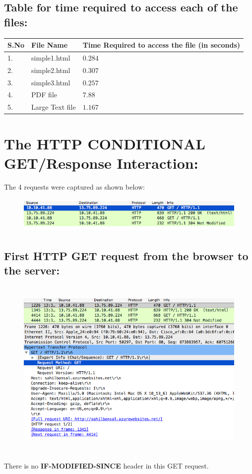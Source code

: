 \documentclass[]{report}
\begin{document}
\subsection{Table for time required to access each of the files:}
\large
\begin{center}
	\begin{tabular}{ |p{1cm}|p{3cm}|p{8cm}|  }
		\hline
		S.No & File Name & Time Required to access the file (in seconds)	\\
		\hline
		1. & simple1.html & $0.284$ \\
		\hline
		2. & simple2.html & $0.307$ \\
		\hline
		3. & simple3.html & $0.257$\\
		\hline
		4. & PDF file & $7.88$ \\
		\hline
		5. & Large Text file & $1.167$\\
		\hline
	\end{tabular} 
\end{center}


\section{The HTTP CONDITIONAL GET/Response Interaction:}
The 4 requests were captured as shown below:
\begin{figure}[H]
	\vspace{0pt}
	\includegraphics[height = 50pt, keepaspectratio]{Snapshots/q2/2.png}
\end{figure}
\subsection{First HTTP GET request from the browser to the server:}
\begin{figure}[H]
	\vspace{0pt}
	\includegraphics[height = 250pt, keepaspectratio]{Snapshots/q2/2_1.png}
\end{figure}
There is no \textbf{IF-MODIFIED-SINCE} header in this GET request.
\end{document}
